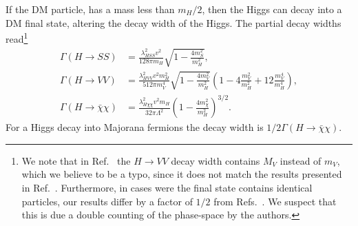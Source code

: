 If the \acs{DM} particle, has a mass less than $m_H/2$, then the Higgs can decay into a \acs{DM} final state, altering the decay width of the Higgs. The partial decay widths read\footnote{We note that in Ref.~\cite{Arcadi:2019lka} the $H \rightarrow VV$ decay width contains $M_V$ instead of $m_V$, which we believe to be a typo, since it does not match the results presented in Ref.~\cite{Djouadi:2011aa}. Furthermore, in cases were the final state contains identical particles, our results differ by a factor of $1/2$ from Refs.~\cite{Arcadi:2019lka,Djouadi:2011aa}. We suspect that this is due a double counting of the phase-space by the authors.}
\begin{equation}
\begin{split}
\Gamma (H \rightarrow SS) &= \frac{\lambda_{HSS}^2 v^2 }{128 \pi m_H} \sqrt{1 - \frac{4 m_S^2}{m_H^2}}, \\
\Gamma (H \rightarrow VV) &= \frac{\lambda_{HVV}^2 v^2 m_H^2 }{512 \pi m_V^4} \sqrt{1 - \frac{4 m_V^2}{m_H^2}} \left(1 - 4 \frac{m_V^2}{m_H^2} + 12 \frac{m_V^4}{ m_H^4} \right), \\
\Gamma (H \rightarrow \bar{\chi} \chi) &= \frac{\lambda_{H\chi\chi}^2 v^2 m_H }{32 \pi \Lambda^2} \left(1 - \frac{4 m_\chi^2}{m_H^2} \right)^{3/2}.
\end{split}
\label{eq:3:Higgs_decay_widths}
\end{equation}
For a Higgs decay into Majorana fermions the decay width is $1/2\Gamma (H \rightarrow \bar{\chi} \chi)$.

